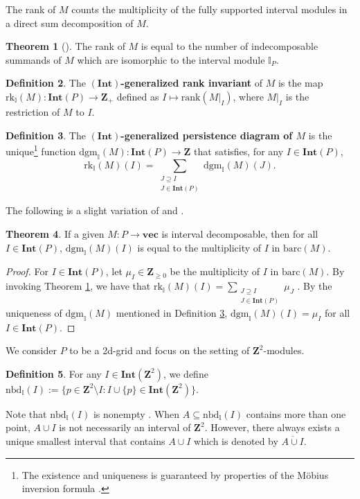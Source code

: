 \documentclass[11pt]{article}
\theoremstyle{definition}
\newtheorem{theorem}{Theorem}[section]
\newtheorem{definition}[theorem]{Definition}
\newcommand{\Zplus}{\mathbf{Z}_{\geq 0}}
\newcommand{\intnbd}{\mathrm{nbd}_{\mathbb{I}}}
\newcommand{\intrk}{\mathrm{rk}_{\mathbb{I}}}
\newcommand{\intdgm}{\mathrm{dgm}_{\mathbb{I}}}
\newcommand{\rank}{\mathrm{rank}}
\newcommand{\Int}{\mathbf{Int}}
\newcommand{\Pb}{P}
\newcommand{\vect}{\mathbf{vec}}
\newcommand{\Z}{\mathbf{Z}}
\newcommand{\barc}{\mathrm{barc}}
\begin{document}
The rank of $M$ counts the multiplicity of the fully supported interval modules in a direct sum decomposition of $M$.
\begin{theorem}[{\cite[Lemma 3.1]{chambers2018persistent}}]
\label{thm:rk}
The rank of $M$ is equal to the number of indecomposable summands of $M$ which are isomorphic to the interval module $\mathbb{I}_{\Pb}$. 
\end{theorem}

\begin{definition}\label{def:rank function} 
The \textbf{$(\Int)$-generalized rank invariant} of $M$ is the map $\intrk(M):\Int(\Pb)\rightarrow \Z_+$ defined as $I\mapsto \rank(M|_I)$, where $M|_I$ is the restriction of $M$ to $I$.
\end{definition}


\begin{definition}\label{def:IGPD} 
The \textbf{$(\Int)$-generalized persistence diagram of $M$} is the unique\footnote{The existence and uniqueness is guaranteed by properties of the M\"obius inversion formula \cite{rota1964foundations,stanley2011enumerative}.} function $\intdgm(M):\Int(\Pb)\rightarrow \Z$ that satisfies, for any $I\in \Int(\Pb)$, \[\intrk(M)(I)=\sum_{\substack{J\supseteq I\\ J\in\Int(\Pb)}}\intdgm(M)(J).\]
\end{definition}

The following is a slight variation of \cite[Theorem 3.14]{kim2018generalized} and \cite[Theorem 5.10]{asashiba2019approximation}.
\begin{theorem}\label{thm:dgm generalizes barc} If a given $M:\Pb\rightarrow\vect$ is interval decomposable, then for all $I\in \Int(\Pb)$,
$\intdgm(M)(I)$ is equal to the multiplicity of $I$ in $\barc(M)$.
\end{theorem}

\begin{proof} For $I\in \Int(\Pb)$, let $\mu_I\in\Zplus$ be the multiplicity of $I$ in $\barc(M)$. By invoking Theorem \ref{thm:rk}, we have that $\intrk(M)(I)=\sum_{\substack{J\supseteq I\\ J\in\Int(\Pb)}} \mu_J$ \cite[Proposition 3.17]{kim2018generalized}. By the uniqueness of $\intdgm(M)$ mentioned in Definition \ref{def:IGPD}, $\intdgm(M)(I)=\mu_I$ for all $I\in \Int(\Pb)$.
\end{proof}

We consider $P$ to be a 2d-grid and focus on the setting of $\Z^2$-modules.

\begin{definition}\label{def:interval neighborhood}For any $I\in\Int(\Z^2)$, we define $\intnbd(I):=\{p\in \Z^2\setminus I: I\cup\{p\}\in \Int(\Z^2)\}.$
\end{definition}
Note that $\intnbd(I)$ is nonempty \cite[Proposition  3.2]{asashiba2019approximation}. 
When $A\subseteq \intnbd(I)$ contains more than one point, $A\cup I$ is not necessarily an interval of $\Z^2$. However, there always  exists a unique smallest interval that contains $A\cup I$ which is denoted by $\overline{A\cup I}$.
\end{document}
